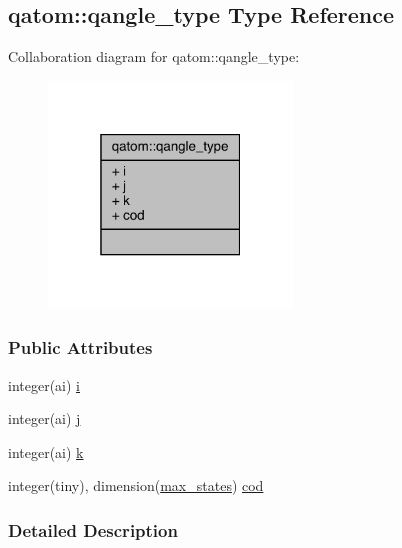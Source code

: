 \hypertarget{structqatom_1_1qangle__type}{\subsection{qatom\-:\-:qangle\-\_\-type Type Reference}
\label{structqatom_1_1qangle__type}
}


Collaboration diagram for qatom\-:\-:qangle\-\_\-type\-:
\nopagebreak
\begin{figure}[H]
\begin{center}
\leavevmode
\includegraphics[width=184pt]{structqatom_1_1qangle__type__coll__graph}
\end{center}
\end{figure}
\subsubsection*{Public Attributes}
\begin{DoxyCompactItemize}
\item 
integer(ai) \hyperlink{structqatom_1_1qangle__type_a2a83ac16d6c3ef6b066b4ae6a0796bb7}{i}
\item 
integer(ai) \hyperlink{structqatom_1_1qangle__type_ac51adae027ccd9fcd86bb2604f2ee9f7}{j}
\item 
integer(ai) \hyperlink{structqatom_1_1qangle__type_a4c48768a4290e30094749685513e21c2}{k}
\item 
integer(tiny), dimension(\hyperlink{classqatom_ad89179e7bcdef29e13211330d1b8fd20}{max\-\_\-states}) \hyperlink{structqatom_1_1qangle__type_afb3fd11cfc8dd8ea2cb588564a86dd83}{cod}
\end{DoxyCompactItemize}


\subsubsection{Detailed Description}



